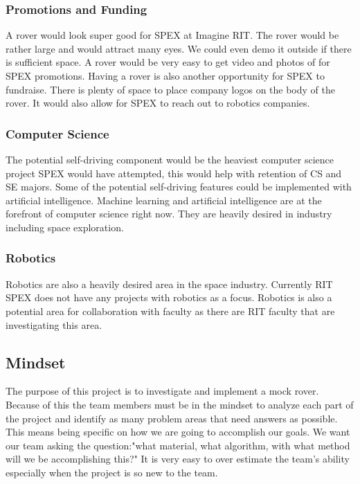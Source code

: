 \documentclass[conference]{IEEEtran} %
\begin{document}
\subsubsection{Promotions and Funding}
A rover would look super good for SPEX at Imagine RIT. 
The rover would be rather large and would attract many eyes. We could even demo it outside if there is sufficient space. 
A rover would be very easy to get video and photos of for SPEX promotions. 
Having a rover is also another opportunity for SPEX to fundraise. 
There is plenty of space to place company logos on the body of the rover. 
It would also allow for SPEX to reach out to robotics companies.
\subsubsection{Computer Science}
The potential self-driving component would be the heaviest computer science project SPEX would have attempted, this would help with retention of CS and SE majors. 
Some of the potential self-driving features could be implemented with artificial intelligence.
Machine learning and artificial intelligence are at the forefront of computer science right now. 
They are heavily desired in industry including space exploration.
\subsubsection{Robotics}
\label{robotics}
Robotics are also a heavily desired area in the space industry. Currently RIT SPEX does not have any projects with robotics as a focus. Robotics is also a potential area for collaboration with faculty as there are RIT faculty that are investigating this area.



\subsection{Mindset}
\label{subsec:mindset}
The purpose of this project is to investigate and implement a mock rover.
Because of this the team members must be in the mindset to analyze each part of the project and identify as many problem areas that need answers as possible. 
This means being specific on how we are going to accomplish our goals.
We want our team asking the question:"what material, what algorithm, with what method will we be accomplishing this?"
It is very easy to over estimate the team's ability especially when the project is so new to the team.
\end{document}
